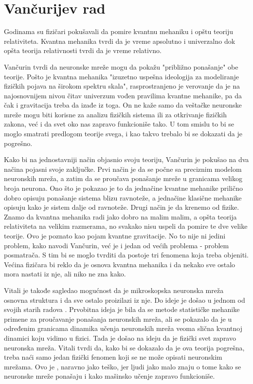 \documentclass[a4paper]{article}
\begin{document}
\section{Vančurijev rad}

Godinama su fizičari pokušavali da pomire kvantnu mehaniku i opštu teoriju relativiteta. Kvantna mehanika tvrdi da je vreme apsolutno i univerzalno dok opšta teorija relativnosti tvrdi da je vreme relativno.

Vančurin tvrdi da neuronske mreže mogu da pokažu "približno ponašanje" obe teorije. Pošto je kvantna mehanika "izuzetno uspešna ideologija za modeliranje fizičkih pojava na širokom spektru skala", rasprostranjeno je verovanje da je na najosnovnijem nivou čitav univerzum vođen pravilima kvantne mehanike, pa da čak i gravitacija treba da izađe iz toga. On ne kaže samo da veštačke neuronske mreže mogu biti korisne za analizu fizičkih sistema ili za otkrivanje fizičkih zakona, već i da svet oko nas zapravo funkcioniše tako. U tom smislu to bi se moglo smatrati predlogom teorije svega, i kao takvo trebalo bi se dokazati da je pogrešno. 

Kako bi na jednostavniji način objasnio svoju teoriju, Vančurin je pokušao na dva načina pojasni svoje zaključke. Prvi način je da se počne sa preciznim modelom neuronskih mreža, a zatim da se proučava ponašanje mreže u granicama velikog broja neurona. Ono što je pokazao je to da jednačine kvantne mehanike prilično dobro opisuju ponašanje sistema blizu ravnoteže, a jednačine klasične mehanike opisuju kako je sistem dalje od ravnoteže. Drugi način je da krenemo od fizike. Znamo da kvantna mehanika radi jako dobro na malim malim, a opšta teorija relativiteta na velikim razmerama, no svakako nisu uspeli da pomire te dve velike teorije. Ovo je poznato kao pojam kvantne gravitacije. No to nije ni jedini problem, kako navodi Vančurin, već je i jedan od većih problema - problem posmatrača. S tim bi se moglo tvrditi da postoje tri fenomena koja treba objeniti. Većina fizičara bi reklo da je osnova kvantna mehanika i da nekako sve ostalo mora nastati iz nje, ali niko ne  zna kako. 

Vitali je takođe sagledao mogućnost da je mikroskopska neuronska mreža osnovna struktura i da sve ostalo proizilazi iz nje. Do ideje je došao u jednom od svojih starih radova \cite{5}. Prvobitna ideja je bila da se metode statističke mehanike primene za proučavanje ponašanja neuronskih mreža, ali se pokazalo da je u određenim granicama dinamika učenja neuronskih mreža veoma slična kvantnoj dinamici koju vidimo u fizici. Tada je došao na ideju da je fizički svet zapravo neuronska mreža. Vitali tvrdi da, kako bi se dokazalo da je ova teorija pogrešna, treba naći samo jedan fizički fenomen koji se ne može opisati neuronskim mrežama. Ovo je , naravno jako teško, jer ljudi jako malo znaju o tome kako se neuronske mreže ponašaju i kako mašinsko učenje zapravo funkcioniše. 
\end{document}
